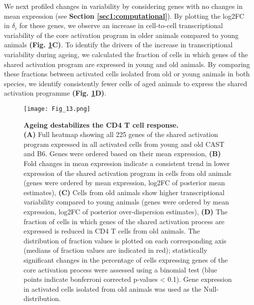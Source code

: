 We next profiled changes in variability by considering genes with no changes in mean expression (see \textbf{Section \ref{sec1:computational}}). By plotting the log2FC in $\delta_i$ for these genes, we observe an increase in cell-to-cell transcriptional variability of the core activation program in older animals compared to young animals \textbf{(Fig. \ref{fig1:variability_ageing}C)}. To identify the drivers of the increase in transcriptional variability during ageing, we calculated the fraction of cells in which genes of the shared activation program are expressed in young and old animals. By comparing these fractions between activated cells isolated from old or young animals in both species, we identify consistently fewer cells of aged animals to express the shared activation programme \textbf{(Fig. \ref{fig1:variability_ageing}D)}. \\

\newpage

\begin{figure}[!ht]
\centering
\texttt{[image: Fig\_13.png]}
\caption[Ageing destabilizes the CD4\plus{} T cell response]{\textbf{Ageing destabilizes the CD4\plus{} T cell response.} \\
\textbf{(A)} Full heatmap showing all 225 genes of the shared activation program expressed in all activated cells from young and old CAST and B6. Genes were ordered based on their mean expression, \textbf{(B)} Fold changes in mean expression indicate a consistent trend in lower expression of the shared activation program in cells from old animals (genes were ordered by mean expression, log2FC of posterior mean estimates), \textbf{(C)} Cells from old animals show higher transcriptional variability compared to young animals (genes were ordered by mean expression, log2FC of posterior over-dispersion estimates), \textbf{(D)} The fraction of cells in which genes of the shared activation process are expressed is reduced in CD4\plus{} T cells from old animals. The distribution of fraction values is plotted on each corresponding axis (medians of fraction values are indicated in red); statistically significant changes in the percentage of cells expressing genes of the core activation process were assessed using a binomial test (blue points indicate bonferroni corrected p-values < 0.1). Gene expression in activated cells isolated from old animals was used as the Null-distribution.}
\label{fig1:variability_ageing}
\end{figure}

\newpage


